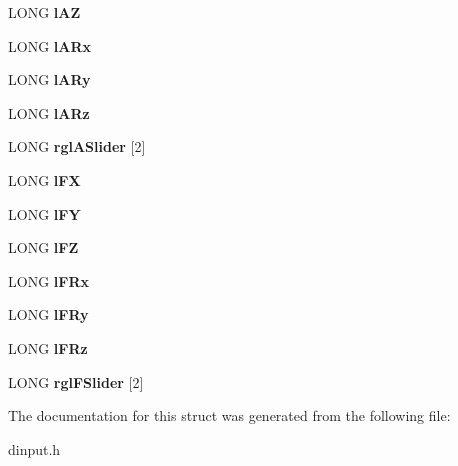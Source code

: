 \begin{DoxyCompactItemize}
\item 
\hypertarget{struct_d_i_j_o_y_s_t_a_t_e2_accbe8e5974b9e86925083507b637be7e}{L\-O\-N\-G {\bfseries l\-A\-Z}}\label{struct_d_i_j_o_y_s_t_a_t_e2_accbe8e5974b9e86925083507b637be7e}

\item 
\hypertarget{struct_d_i_j_o_y_s_t_a_t_e2_ad4b47ea7f42a492c1cb197cc8b362483}{L\-O\-N\-G {\bfseries l\-A\-Rx}}\label{struct_d_i_j_o_y_s_t_a_t_e2_ad4b47ea7f42a492c1cb197cc8b362483}

\item 
\hypertarget{struct_d_i_j_o_y_s_t_a_t_e2_a35a38ce4148f2049423fb1f7b9592d53}{L\-O\-N\-G {\bfseries l\-A\-Ry}}\label{struct_d_i_j_o_y_s_t_a_t_e2_a35a38ce4148f2049423fb1f7b9592d53}

\item 
\hypertarget{struct_d_i_j_o_y_s_t_a_t_e2_a8fd6abb5b4987c133fb49f10f4f98918}{L\-O\-N\-G {\bfseries l\-A\-Rz}}\label{struct_d_i_j_o_y_s_t_a_t_e2_a8fd6abb5b4987c133fb49f10f4f98918}

\item 
\hypertarget{struct_d_i_j_o_y_s_t_a_t_e2_a07cfa7a3a169b9288096be4cf037bfd1}{L\-O\-N\-G {\bfseries rgl\-A\-Slider} \mbox{[}2\mbox{]}}\label{struct_d_i_j_o_y_s_t_a_t_e2_a07cfa7a3a169b9288096be4cf037bfd1}

\item 
\hypertarget{struct_d_i_j_o_y_s_t_a_t_e2_a5cee35c66ed45c265dd87601058965c5}{L\-O\-N\-G {\bfseries l\-F\-X}}\label{struct_d_i_j_o_y_s_t_a_t_e2_a5cee35c66ed45c265dd87601058965c5}

\item 
\hypertarget{struct_d_i_j_o_y_s_t_a_t_e2_a5a86f1ad6cd84caf7f2ce7f297af4434}{L\-O\-N\-G {\bfseries l\-F\-Y}}\label{struct_d_i_j_o_y_s_t_a_t_e2_a5a86f1ad6cd84caf7f2ce7f297af4434}

\item 
\hypertarget{struct_d_i_j_o_y_s_t_a_t_e2_af7159fffe6a7ba3c06df759a84cb3603}{L\-O\-N\-G {\bfseries l\-F\-Z}}\label{struct_d_i_j_o_y_s_t_a_t_e2_af7159fffe6a7ba3c06df759a84cb3603}

\item 
\hypertarget{struct_d_i_j_o_y_s_t_a_t_e2_a2c9a66890492b88f9d95a6c1165b784d}{L\-O\-N\-G {\bfseries l\-F\-Rx}}\label{struct_d_i_j_o_y_s_t_a_t_e2_a2c9a66890492b88f9d95a6c1165b784d}

\item 
\hypertarget{struct_d_i_j_o_y_s_t_a_t_e2_a0bc8541c56d9f6eca618f85fea782070}{L\-O\-N\-G {\bfseries l\-F\-Ry}}\label{struct_d_i_j_o_y_s_t_a_t_e2_a0bc8541c56d9f6eca618f85fea782070}

\item 
\hypertarget{struct_d_i_j_o_y_s_t_a_t_e2_a40943bc6f0c92b0b05bd70ae73a3bc35}{L\-O\-N\-G {\bfseries l\-F\-Rz}}\label{struct_d_i_j_o_y_s_t_a_t_e2_a40943bc6f0c92b0b05bd70ae73a3bc35}

\item 
\hypertarget{struct_d_i_j_o_y_s_t_a_t_e2_a071b194919680e21287b4811512e3432}{L\-O\-N\-G {\bfseries rgl\-F\-Slider} \mbox{[}2\mbox{]}}\label{struct_d_i_j_o_y_s_t_a_t_e2_a071b194919680e21287b4811512e3432}

\end{DoxyCompactItemize}


The documentation for this struct was generated from the following file\-:\begin{DoxyCompactItemize}
\item 
dinput.\-h\end{DoxyCompactItemize}

